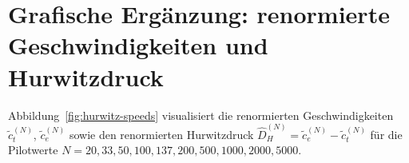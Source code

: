 \usepackage{amsthm}

\theoremstyle{plain}
\newtheorem{satz}{Satz}[section]
\newtheorem{lemma}[satz]{Lemma}
\newtheorem{proposition}[satz]{Proposition}
\newtheorem{korollar}[satz]{Korollar}

\theoremstyle{definition}
\newtheorem{definition}[satz]{Definition}
\newtheorem{bemerkung}[satz]{Bemerkung}
\newtheorem{beispiel}[satz]{Beispiel}
\newtheorem{remark}[satz]{Remark} %


\usepackage{pgfplots}
\pgfplotsset{compat=1.18}

\section{Grafische Erg\"anzung: renormierte Geschwindigkeiten und Hurwitzdruck}

Abbildung~\ref{fig:hurwitz-speeds} visualisiert die renormierten Geschwindigkeiten
\(\tilde c_t^{(N)}\), \(\tilde c_e^{(N)}\) sowie den renormierten Hurwitzdruck
\(\widehat D_H^{(N)}=\tilde c_e^{(N)}-\tilde c_t^{(N)}\) f\"ur die Pilotwerte
\(N=20,33,50,100,137,200,500,1000,2000,5000\).

